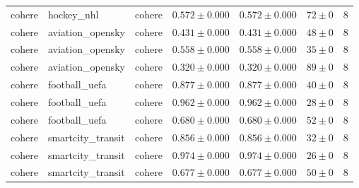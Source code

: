 \begin{table}[htbp]
\begin{tabular}{l l l r r r r}
cohere & hockey\_nhl & cohere & $0.572\pm0.000$ & $0.572\pm0.000$ & $72\pm0$ & 8 \\
cohere & aviation\_opensky & cohere & $0.431\pm0.000$ & $0.431\pm0.000$ & $48\pm0$ & 8 \\
cohere & aviation\_opensky & cohere & $0.558\pm0.000$ & $0.558\pm0.000$ & $35\pm0$ & 8 \\
cohere & aviation\_opensky & cohere & $0.320\pm0.000$ & $0.320\pm0.000$ & $89\pm0$ & 8 \\
cohere & football\_uefa & cohere & $0.877\pm0.000$ & $0.877\pm0.000$ & $40\pm0$ & 8 \\
cohere & football\_uefa & cohere & $0.962\pm0.000$ & $0.962\pm0.000$ & $28\pm0$ & 8 \\
cohere & football\_uefa & cohere & $0.680\pm0.000$ & $0.680\pm0.000$ & $52\pm0$ & 8 \\
cohere & smartcity\_transit & cohere & $0.856\pm0.000$ & $0.856\pm0.000$ & $32\pm0$ & 8 \\
cohere & smartcity\_transit & cohere & $0.974\pm0.000$ & $0.974\pm0.000$ & $26\pm0$ & 8 \\
cohere & smartcity\_transit & cohere & $0.677\pm0.000$ & $0.677\pm0.000$ & $50\pm0$ & 8 \\
\hline
\end{tabular}
\end{table}
